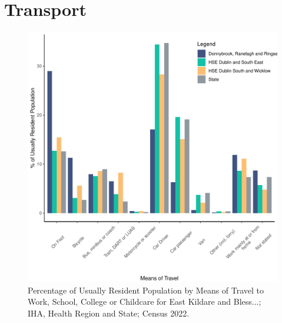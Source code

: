 \documentclass{article}
\begin{document}
\section{Transport}\label{sect:Trans}
\begin{figure}[H]
	\centering
	\includegraphics[width = 120mm]{../figures/TravelED.pdf}
	\caption{Percentage of Usually Resident Population by Means of Travel to Work, School, College or Childcare for East Kildare and Bless...; IHA, Health Region and State; Census 2022.}
	\label{fig:vbnv}
	\end{figure}
\end{document}
